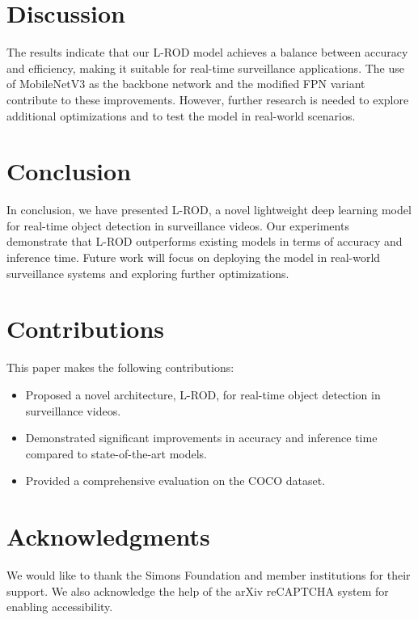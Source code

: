 \documentclass{article}
\begin{document}
\section{Discussion}
The results indicate that our L-ROD model achieves a balance between accuracy and efficiency, making it suitable for real-time surveillance applications. The use of MobileNetV3 as the backbone network and the modified FPN variant contribute to these improvements. However, further research is needed to explore additional optimizations and to test the model in real-world scenarios.

\section{Conclusion}
In conclusion, we have presented L-ROD, a novel lightweight deep learning model for real-time object detection in surveillance videos. Our experiments demonstrate that L-ROD outperforms existing models in terms of accuracy and inference time. Future work will focus on deploying the model in real-world surveillance systems and exploring further optimizations.

\section{Contributions}
This paper makes the following contributions:
\begin{itemize}
    \item Proposed a novel architecture, L-ROD, for real-time object detection in surveillance videos.
    \item Demonstrated significant improvements in accuracy and inference time compared to state-of-the-art models.
    \item Provided a comprehensive evaluation on the COCO dataset.
\end{itemize}

\section*{Acknowledgments}
We would like to thank the Simons Foundation and member institutions for their support. We also acknowledge the help of the arXiv reCAPTCHA system for enabling accessibility.



\end{document}

